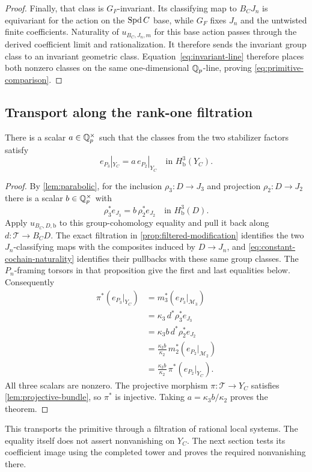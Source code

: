 \begin{proof}
Finally, that class is $G_F$-invariant.  Its classifying map to
$B_CJ_n$ is equivariant for the action on the $\operatorname{Spd} C$ base, while
$G_F$ fixes $J_n$ and the untwisted finite coefficients.  Naturality
of $u_{B_C,J_n,m}$ for this base action passes through the derived
coefficient limit and rationalization.  It therefore sends the
invariant group class to an invariant geometric class.
Equation~\eqref{eq:invariant-line} therefore places both nonzero
classes on the same one-dimensional $\mathbb Q_p$-line, proving
\cref{eq:primitive-comparison}.
\end{proof}

\subsection{Transport along the rank-one filtration}

\begin{theorem}\label{thm:geometric-transport}
There is a scalar $a\in\mathbb Q_p^\times$ such that the classes from the two
stabilizer factors satisfy
\begin{equation}\label{eq:geometric-transport}
 e_{P_3}|_{Y_C}=a\,e_{P_2}|_{Y_C}
       \quad\text{in }H^3_{\mathrm b}(Y_C).
\end{equation}
\end{theorem}

\begin{proof}
By \cref{lem:parabolic}, for the inclusion $\rho_3:D\to J_3$ and
projection $\rho_2:D\to J_2$ there is a scalar $b\in\mathbb Q_p^\times$
with
\[
 \rho_3^*e_{J_3}=b\,\rho_2^*e_{J_2}
       \quad\text{in }H^3_{\mathrm b}(D).
\]
Apply $u_{B_C,D,\mathrm b}$ to this group-cohomology equality and
pull it back along $d:\mathcal T\to B_CD$.
The exact filtration in \cref{prop:filtered-modification} identifies
the two $J_n$-classifying maps with the composites induced by
$D\to J_n$, and \eqref{eq:constant-cochain-naturality} identifies
their pullbacks with these same group classes.  The $P_n$-framing
torsors in that proposition give the first and last equalities below.
Consequently
\[
 \begin{aligned}
 \pi^*(e_{P_3}|_{Y_C})
   &=m_3^*(e_{P_3}|_{\mathcal M_3})\\
   &=\kappa_3\,d^*\rho_3^*e_{J_3}\\
   &=\kappa_3b\,d^*\rho_2^*e_{J_2}\\
   &=\frac{\kappa_3b}{\kappa_2}\,
                  m_2^*(e_{P_2}|_{\mathcal M_2})\\
   &=\frac{\kappa_3b}{\kappa_2}\,\pi^*(e_{P_2}|_{Y_C}).
 \end{aligned}
\]
All three scalars are nonzero.  The projective morphism
$\pi:\mathcal T\to Y_C$ satisfies
\cref{lem:projective-bundle}, so $\pi^*$ is injective.
Taking $a=\kappa_3b/\kappa_2$ proves the theorem.
\end{proof}

This transports the primitive through a filtration of rational local
systems.  The equality itself does not assert nonvanishing on $Y_C$.
The next section tests its coefficient image using the completed
tower and proves the required nonvanishing there.
